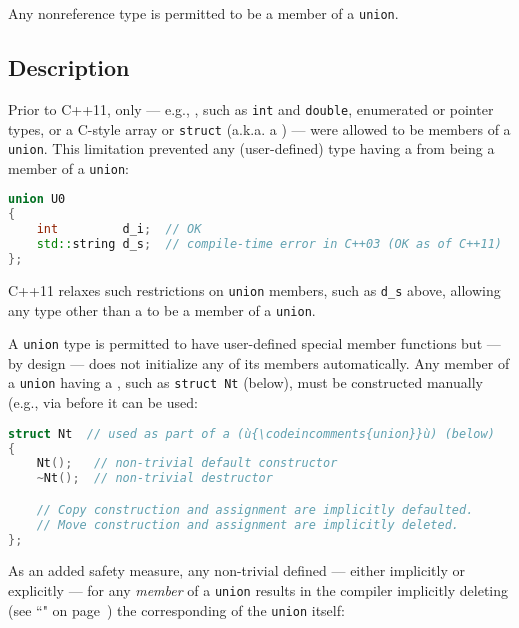 

Any nonreference type is permitted to be a member of a \lstinline!union!.

\subsection[Description]{Description}\label{unrestrictedunion-description}

Prior to C++11, only  --- e.g.,
, such as \lstinline!int! and \lstinline!double!,
enumerated or pointer types, or a C-style array or \lstinline!struct!
(a.k.a. a ) --- were allowed to be members of a
\lstinline!union!. This limitation prevented any (user-defined) type having
a  from being a member of a
\lstinline!union!:

\begin{lstlisting}[language=C++]
union U0
{
    int         d_i;  // OK
    std::string d_s;  // compile-time error in C++03 (OK as of C++11)
};
\end{lstlisting}
    
\noindent C++11 relaxes such restrictions on \lstinline!union! members, such as
\lstinline!d_s! above, allowing any type other than a  to be a member of a \lstinline!union!.

A \lstinline!union! type is permitted to have user-defined special member
functions but --- by design --- does not initialize any of its members
automatically. Any member of a \lstinline!union! having a
, such as \lstinline!struct!~\lstinline!Nt!
(below), must be constructed manually (e.g., via  before it can be used:

\begin{lstlisting}[language=C++]
struct Nt  // used as part of a (ù{\codeincomments{union}}ù) (below)
{
    Nt();   // non-trivial default constructor
    ~Nt();  // non-trivial destructor

    // Copy construction and assignment are implicitly defaulted.
    // Move construction and assignment are implicitly deleted.
};
\end{lstlisting}
    
\noindent As an added safety measure, any non-trivial  defined --- either implicitly or explicitly --- for any
\emph{member} of a \lstinline!union! results in the compiler implicitly
deleting (see %
``" on page~\pageref{deleted-functions}) the corresponding  of the \lstinline!union! itself:

